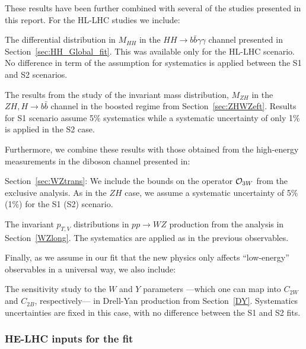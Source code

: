 These results have been further combined with several of the studies presented in this report. 
  For the HL-LHC studies we include:
  \begin{enumerate}
  {\item The differential distribution in $M_{HH}$ in the $HH\to b\bar{b}\gamma\gamma$ channel presented in Section~\ref{sec:HH_Global_fit}. This was available only for the HL-LHC scenario. No difference in term of the assumption for systematics is applied between the S1 and S2 scenarios.}
  {\item The results from the study of the invariant mass distribution, $M_{ZH}$ in the $ZH, H\to b\bar{b}$ channel in the boosted regime from Section~\ref{sec:ZHWZeft}. Results for S1 scenario assume 5\% systematics while a systematic uncertainty of only 1\% is applied in the S2 case. 
  }
  \end{enumerate}
 Furthermore, we combine these results with those obtained from the high-energy measurements in the diboson channel presented in:
 \begin{enumerate}
 \setcounter{enumi}{2}
 {\item Section~\ref{sec:WZtrans}: We include the bounds on the operator ${\cal O}_{3W}$ from the exclusive analysis. As in the $ZH$ case, we assume a systematic uncertainty of 5\% (1\%) for the S1 (S2) scenario.}
 {\item The invariant $p_{T,V}$ distributions in $pp\to WZ$ production from the analysis in Section~\ref{WZlong}. The systematics are applied as in the previous observables.}  
 \end{enumerate}
%
Finally, as we assume in our fit that the new physics only affects ``low-energy'' observables in a universal way, we also include:
%
\begin{enumerate}
\setcounter{enumi}{4}
%
{\item The sensitivity study to the $W$ and $Y$ parameters ---which one can map into $C_{2W}$ and $C_{2B}$, respectively--- in Drell-Yan
production from Section~\ref{DY}. Systematics uncertainties are fixed in this case, with no difference between the S1 and S2 fits.}
%
\end{enumerate}
%


\subsubsection*{HE-LHC inputs for the fit}

